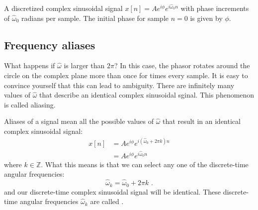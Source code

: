 \begin{marginfigure}
\begin{center}
  \end{center}
  \caption{A discretized complex sinusoidal signal $x[n] = A e^{i\phi}e^{i\hat{\omega}_0n}$ 
  with phase increments of $\hat{\omega}_0$ radians per sample. The initial phase for sample $n=0$ is given by $\phi$.}
  \label{fig:rotating_dt_phasor}
\end{marginfigure}

\subsection{Frequency aliases}

What happens if $\hat{\omega}$ is larger than $2\pi$? In this case,
the phasor rotates around the circle on the complex plane more than
once for times every sample. It is easy to convince yourself that this
can lead to ambiguity. There are infinitely many values of
$\hat{\omega}$ that describe an identical complex sinusoidal
sginal. This phenomenon is called aliasing.

Aliases of a signal mean all the possible values of $\hat{\omega}$ that
result in an identical complex sinusoidal signal:
\begin{align}
  x[n] & =Ae^{i\phi} e^{i(\hat{\omega}_0 + 2\pi k) n} \\
       & =Ae^{i\phi} e^{i \hat{\omega}_0  n}
\end{align}
where $k\in\mathbb{Z}$. What this means is that we can select any one
of the discrete-time angular frequencies:
\begin{equation}
  \boxed{
    \hat{\omega}_k = \hat{\omega}_0 + 2\pi k
  }\,\,.
\end{equation}
and our discrete-time complex sinusoidal signal will be
identical. These discrete-time angular frequencies $\hat{\omega}_k$
are called \emph{}.


